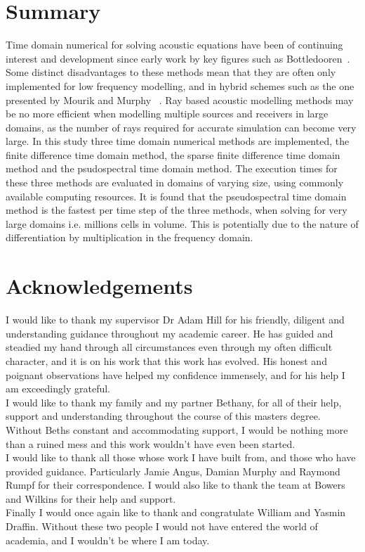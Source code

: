 
%
%
%

\chapter*{Summary}
Time domain numerical for solving acoustic equations have been of continuing interest and development since early work by key figures such as Bottledooren~\cite{Botteldooren1995}. Some distinct disadvantages to these methods mean that they are often only implemented for low frequency modelling, and in hybrid schemes such as the one presented by Mourik and Murphy ~\cite{Mourik2014a}. Ray based acoustic modelling methods may be no more efficient when modelling multiple sources and receivers in large domains, as the number of rays required for accurate simulation can become very large. In this study three time domain numerical methods are implemented, the finite difference time domain method, the sparse finite difference time domain method and the psudospectral time domain method. The execution times for these three methods are evaluated in domains of varying size, using commonly available computing resources. It is found that the pseudospectral time domain method is the fastest per time step of the three methods, when solving for very large domains i.e. millions cells in volume. This is potentially due to the nature of differentiation by multiplication in the frequency domain.

\chapter*{Acknowledgements}

I would like to thank my supervisor Dr Adam Hill for his friendly, diligent and understanding guidance throughout my academic career. He has guided and steadied my hand through all circumstances even through my often difficult character, and it is on his work that this work has evolved. His honest and poignant observations have helped my confidence immensely, and for his help I am exceedingly grateful.\\

I would like to thank my family and my partner Bethany, for all of their help, support and understanding throughout the course of this masters degree. Without Beths constant and accommodating support, I would be nothing more than a ruined mess and this work wouldn't have even been started.\\

I would like to thank all those whose work I have built from, and those who have provided guidance. Particularly Jamie Angus, Damian Murphy and Raymond Rumpf for their correspondence. I would also like to thank the team at Bowers and Wilkins for their help and support.\\

Finally I would once again like to thank and congratulate William and Yasmin Draffin. Without these two people I would not have entered the world of academia, and I wouldn't be where I am today.